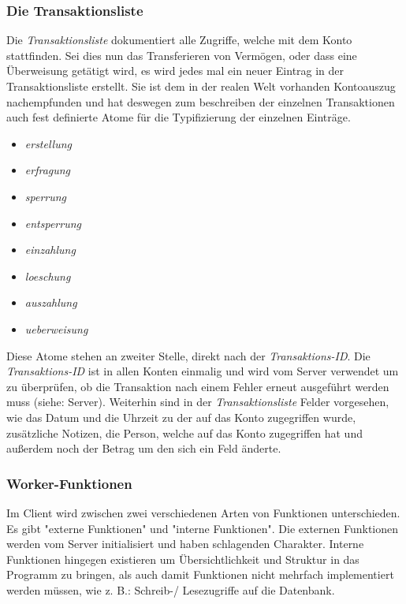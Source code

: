 \subsubsection{Die Transaktionsliste}
Die \textit{Transaktionsliste} dokumentiert alle Zugriffe, welche mit dem Konto stattfinden. Sei dies nun das Transferieren von Vermögen, oder dass eine Überweisung getätigt wird, es wird jedes mal ein neuer Eintrag in der Transaktionsliste erstellt. Sie ist dem in der realen Welt vorhanden Kontoauszug nachempfunden und hat deswegen zum beschreiben der einzelnen Transaktionen auch fest definierte Atome für die Typifizierung der einzelnen Einträge.
\begin{itemize}
\item \textit{erstellung}
\item \textit{erfragung}
\item \textit{sperrung}
\item \textit{entsperrung}
\item \textit{einzahlung}
\item \textit{loeschung}
\item \textit{auszahlung}
\item \textit{ueberweisung}
\end{itemize}
Diese Atome stehen an zweiter Stelle, direkt nach der \textit{Transaktions-ID}. Die \textit{Transaktions-ID} ist in allen Konten einmalig und wird vom Server verwendet um zu überprüfen, ob die Transaktion nach einem Fehler erneut ausgeführt werden muss (siehe: Server). Weiterhin sind in der \textit{Transaktionsliste} Felder vorgesehen, wie das Datum und die Uhrzeit zu der auf das Konto zugegriffen wurde, zusätzliche Notizen, die Person, welche auf das Konto zugegriffen hat und außerdem noch der Betrag um den sich ein Feld änderte. 
\subsubsection{Worker-Funktionen}
Im Client wird zwischen zwei verschiedenen Arten von Funktionen unterschieden. Es gibt "externe Funktionen" und "interne Funktionen". Die externen Funktionen werden vom Server initialisiert und haben schlagenden Charakter. Interne Funktionen hingegen existieren um Übersichtlichkeit und Struktur in das Programm zu bringen, als auch damit Funktionen nicht mehrfach implementiert werden müssen, wie z. B.: Schreib-/ Lesezugriffe auf die Datenbank.

